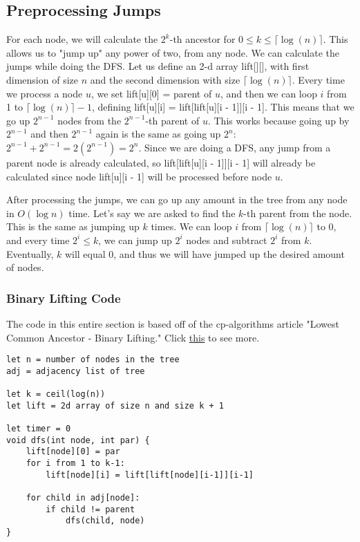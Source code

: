 \documentclass{article}
\begin{document}
\subsection{Preprocessing Jumps}
For each node, we will calculate the $2^k$-th ancestor for $0 \leq k \leq \lceil \log (n) \rceil$. This allows us to "jump up" any power of two, from any node. We can calculate the jumps while doing the DFS. Let us define an 2-d array lift[][], with first dimension of size $n$ and the second dimension with size $\lceil \log (n) \rceil$. Every time we process a node $u$, we set lift[u][0] = parent of $u$, and then we can loop $i$ from 1 to $\lceil \log (n)\rceil - 1$, defining lift[u][i] = lift[lift[u][i - 1]][i - 1]. This means that we go up $2^{n - 1}$ nodes from the $2^{n - 1}$-th parent of $u$. This works because going up by $2^{n - 1}$ and then $2^{n - 1}$ again is the same as going up $2^{n}$: $2^{n - 1} + 2^{n - 1} = 2(2^{n - 1}) = 2^n$. Since we are doing a DFS, any jump from a parent node is already calculated, so lift[lift[u][i - 1]][i - 1] will already be calculated since node lift[u][i - 1] will be processed before node $u$.

After processing the jumps, we can go up any amount in the tree from any node in $O(\log n)$ time. Let's say we are asked to find the $k$-th parent from the node. This is the same as jumping up $k$ times. We can loop $i$ from $\lceil \log (n) \rceil$ to 0, and every time $2^i \leq k$, we can jump up $2^i$ nodes and subtract $2^i$ from $k$. Eventually, $k$ will equal 0, and thus we will have jumped up the desired amount of nodes.

\subsubsection{Binary Lifting Code}
The code in this entire section is based off of the cp-algorithms article "Lowest Common Ancestor - Binary Lifting." Click \href{https://cp-algorithms.com/graph/lca_binary_lifting.html}{this} to see more.
\begin{lstlisting}
let n = number of nodes in the tree
adj = adjacency list of tree

let k = ceil(log(n))
let lift = 2d array of size n and size k + 1

let timer = 0
void dfs(int node, int par) {
	lift[node][0] = par
	for i from 1 to k-1:
		lift[node][i] = lift[lift[node][i-1]][i-1]
	
	for child in adj[node]:
		if child != parent
			dfs(child, node)
}
\end{lstlisting}
\end{document}

